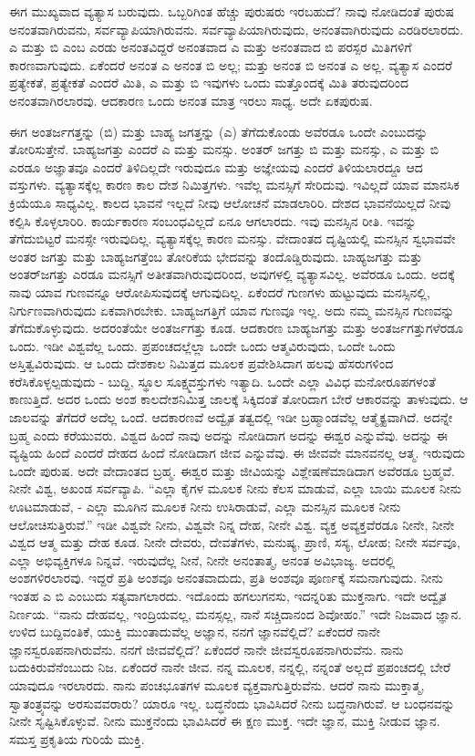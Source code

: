 ಈಗ ಮುಖ್ಯವಾದ ವ್ಯತ್ಯಾಸ ಬರುವುದು. ಒಬ್ಬರಿಗಿಂತ ಹೆಚ್ಚು ಪುರುಷರು ಇರಬಹುದೆ? ನಾವು ನೋಡಿದಂತೆ ಪುರುಷ ಅನಂತವಾಗಿರುವನು, ಸರ್ವವ್ಯಾಪಿಯಾಗಿರುವನು. ಸರ್ವವ್ಯಾಪಿಯಾಗಿರುವುದು, ಅನಂತವಾಗಿರುವುದು ಎರಡಿರಲಾರದು. ಎ ಮತ್ತು ಬಿ ಎಂಬ ಎರಡು ಅನಂತವಿದ್ದರೆ ಅನಂತವಾದ ಎ ಮತ್ತು ಅನಂತವಾದ ಬಿ ಪರಸ್ಪರ ಮಿತಿಗಳಿಗೆ ಕಾರಣವಾಗುವುದು. ಏಕೆಂದರೆ ಅನಂತ ಎ ಅನಂತ ಬಿ ಅಲ್ಲ; ಮತ್ತು ಅನಂತ ಬಿ ಅನಂತ ಎ ಅಲ್ಲ. ವ್ಯತ್ಯಾಸ ಎಂದರೆ ಪ್ರತ್ಯೇಕತೆ, ಪ್ರತ್ಯೇಕತೆ ಎಂದರೆ ಮಿತಿ, ಎ ಮತ್ತು ಬಿ ಇವುಗಳು ಒಂದು ಮತ್ತೊಂದಕ್ಕೆ ಮಿತಿ ತರುವುದರಿಂದ ಅನಂತವಾಗಿರಲಾರವು. ಆದಕಾರಣ ಒಂದು ಅನಂತ ಮಾತ್ರ ಇರಲು ಸಾಧ್ಯ. ಅದೇ ಏಕಪುರುಷ.

ಈಗ ಅಂತರ್ಜಗತ್ತನ್ನು (ಬಿ) ಮತ್ತು ಬಾಹ್ಯ ಜಗತ್ತನ್ನು (ಎ) ತೆಗೆದುಕೊಂಡು ಅವೆರಡೂ ಒಂದೇ ಎಂಬುದನ್ನು ತೋರಿಸುತ್ತೇನೆ. ಬಾಹ್ಯಜಗತ್ತು ಎಂದರೆ ಎ ಮತ್ತು ಮನಸ್ಸು. ಅಂತರ್‌ ಜಗತ್ತು ಬಿ ಮತ್ತು ಮನಸ್ಸು, ಎ ಮತ್ತು ಬಿ ಎರಡೂ ಅಜ್ಞಾತವೂ ಎಂದರೆ ತಿಳಿದಿಲ್ಲದೇ ಇರುವುದೂ ಮತ್ತು ಅಜ್ಞೇಯವು ಎಂದರೆ ತಿಳಿಯಲಾರದ್ದೂ ಆದ ವಸ್ತುಗಳು. ವ್ಯತ್ಯಾಸಕ್ಕೆಲ್ಲ ಕಾರಣ ಕಾಲ ದೇಶ ನಿಮಿತ್ತಗಳು. ಇವೆಲ್ಲ ಮನಸ್ಸಿಗೆ ಸೇರಿದುವು. ಇವಿಲ್ಲದೆ ಯಾವ ಮಾನಸಿಕ ಕ್ರಿಯೆಯೂ ಸಾಧ್ಯವಿಲ್ಲ. ಕಾಲದ ಭಾವನೆ ಇಲ್ಲದೆ ನೀವು ಆಲೋಚನೆ ಮಾಡಲಾರಿರಿ. ದೇಶದ ಭಾವನೆಯಿಲ್ಲದೆ ನೀವು ಕಲ್ಪಿಸಿ ಕೊಳ್ಳಲಾರಿರಿ. ಕಾರ್ಯಕಾರಣ ಸಂಬಂಧವಿಲ್ಲದೆ ಏನೂ ಆಗಲಾರದು. ಇವು ಮನಸ್ಸಿನ ರೀತಿ. ಇವನ್ನು ತೆಗೆದುಬಿಟ್ಟರೆ ಮನಸ್ಸೇ ಇರುವುದಿಲ್ಲ. ವ್ಯತ್ಯಾಸಕ್ಕೆಲ್ಲ ಕಾರಣ ಮನಸ್ಸು. ವೇದಾಂತದ ದೃಷ್ಟಿಯಲ್ಲಿ ಮನಸ್ಸಿನ ಸ್ವಭಾವವೇ ಅಂತರ ಜಗತ್ತು ಮತ್ತು ಬಾಹ್ಯಜಗತ್ತೆಂಬ ತೋರಿಕೆಯ ಭೇದವನ್ನು ತಂದೊಡ್ಡಿರುವುದು. ಬಾಹ್ಯಜಗತ್ತು ಮತ್ತು ಅಂತರ್‌ಜಗತ್ತು ಎರಡೂ ಮನಸ್ಸಿಗೆ ಅತೀತವಾಗಿರುವುದರಿಂದ, ಅವುಗಳಲ್ಲಿ ವ್ಯತ್ಯಾಸವಿಲ್ಲ. ಅವೆರಡೂ ಒಂದು. ಅದಕ್ಕೆ ನಾವು ಯಾವ ಗುಣವನ್ನೂ ಆರೋಪಿಸುವುದಕ್ಕೆ ಆಗುವುದಿಲ್ಲ. ಏಕೆಂದರೆ ಗುಣಗಳು ಹುಟ್ಟುವುದು ಮನಸ್ಸಿನಲ್ಲಿ, ನಿರ್ಗುಣವಾಗಿರುವುದು ಏಕವಾಗಿರಬೇಕು. ಬಾಹ್ಯಜಗತ್ತಿಗೆ ಯಾವ ಗುಣವೂ ಇಲ್ಲ. ಅದು ನಮ್ಮ ಮನಸ್ಸಿನ ಗುಣವನ್ನು ತೆಗೆದುಕೊಳ್ಳುವುದು. ಅದರಂತೆಯೇ ಅಂತರ್ಜಗತ್ತು ಕೂಡ. ಆದಕಾರಣ ಬಾಹ್ಯಜಗತ್ತು ಮತ್ತು ಅಂತರ್ಜಗತ್ತುಗಳೆರಡೂ ಒಂದು. ಇಡೀ ವಿಶ್ವವೆಲ್ಲ ಒಂದು. ಪ್ರಪಂಚದಲ್ಲೆಲ್ಲಾ ಒಂದೇ ಒಂದು ಆತ್ಮವಿರುವುದು, ಒಂದೇ ಒಂದು ಅಸ್ತಿತ್ವವಿರುವುದು. ಆ ಒಂದು ದೇಶಕಾಲ ನಿಮಿತ್ತದ ಮೂಲಕ ಪ್ರವೇಶಿಸಿದಾಗ ಹಲವು ಹೆಸರುಗಳಿಂದ ಕರೆಸಿಕೊಳ್ಳಲ್ಪಡುವುದು - ಬುದ್ದಿ, ಸ್ಥೂಲ ಸೂಕ್ಷ್ಮವಸ್ತುಗಳು ಇತ್ಯಾದಿ. ಒಂದೇ ಎಲ್ಲಾ ವಿವಿಧ ಮನೋರೂಪಗಳಂತೆ ಕಾಣುತ್ತಿದೆ. ಅದರ ಒಂದು ಅಂಶ ಕಾಲದೇಶನಿಮಿತ್ತ ಜಾಲಕ್ಕೆ ಸಿಕ್ಕಿದಂತೆ ತೋರಿದಾಗ ಬೇರೆ ಆಕಾರವನ್ನು ತಾಳುವುದು. ಆ ಜಾಲವನ್ನು ತೆಗೆದರೆ ಅದೆಲ್ಲ ಒಂದೆ. ಆದಕಾರಣವೆ ಅದ್ವೈತ ತತ್ವದಲ್ಲಿ ಇಡೀ ಬ್ರಹ್ಮಾಂಡವೆಲ್ಲ ಆತ್ಮೈಕ್ಯವಾಗಿದೆ. ಅದನ್ನೇ ಬ್ರಹ್ಮ ಎಂದು ಕರೆಯುವರು. ವಿಶ್ವದ ಹಿಂದೆ ನಾವು ಅದನ್ನು ನೋಡಿದಾಗ ಅದನ್ನು ಈಶ್ವರ ಎನ್ನುವೆವು. ಅದನ್ನು ಈ ವ್ಯಷ್ಟಿಯ ಹಿಂದೆ ಎಂದರೆ ದೇಹದ ಹಿಂದೆ ನೋಡಿದಾಗ ಜೀವ ಎನ್ನುವೆವು. ಈ ಜೀವವೇ ಮಾನವನಲ್ಲ ಆತ್ಮ. ಇರುವುದು ಒಂದೇ ಪುರುಷ. ಅದೇ ವೇದಾಂತದ ಬ್ರಹ್ಮ. ಈಶ್ವರ ಮತ್ತು ಜೀವಿಯನ್ನು ವಿಶ್ಲೇಷಣೆಮಾಡಿದಾಗ ಅವೆರಡೂ ಬ್ರಹ್ಮವೆ. ನೀನೇ ವಿಶ್ವ, ಅಖಂಡ ಸರ್ವವ್ಯಾಪಿ. “ಎಲ್ಲಾ ಕೈಗಳ ಮೂಲಕ ನೀನು ಕೆಲಸ ಮಾಡುವೆ, ಎಲ್ಲಾ ಬಾಯಿ ಮೂಲಕ ನೀನು ಊಟಮಾಡುವೆ, - ಎಲ್ಲಾ ಮೂಗಿನ ಮೂಲಕ ನೀನು ಉಸಿರಾಡುವೆ, ಎಲ್ಲಾ ಮನಸ್ಸಿನ ಮೂಲಕ ನೀನು ಆಲೋಚಿಸುತ್ತಿರುವೆ.'' ಇಡೀ ವಿಶ್ವವೇ ನೀನು, ವಿಶ್ವವೇ ನಿನ್ನ ದೇಹ, ನೀನೇ ವಿಶ್ವ. ವ್ಯಕ್ತ ಅವ್ಯಕ್ತವೆರಡೂ ನೀನೇ, ನೀನೇ ವಿಶ್ವದ ಆತ್ಮ ಮತ್ತು ದೇಹ ಕೂಡ. ನೀನೇ ದೇವರು, ದೇವತೆಗಳು, ಮನುಷ್ಯ, ಪ್ರಾಣಿ, ಸಸ್ಯ, ಲೋಹ; ನೀನೇ ಸರ್ವವೂ, ಎಲ್ಲಾ ಅಭಿವ್ಯಕ್ತಿಗಳೂ ನಿನ್ನವೆ. ಇರುವುದೆಲ್ಲ ನೀನೆ, ನೀನೇ ಅನಂತಾತ್ಮ, ಅನಂತ ಅವಿಭಾಜ್ಯ. ಅದರಲ್ಲಿ ಅಂಶಗಳಿರಲಾರವು. ಇದ್ದರೆ ಪ್ರತಿ ಅಂಶವೂ ಅನಂತವಾದುದು, ಪ್ರತಿ ಅಂಶವೂ ಪೂರ್ಣಕ್ಕೆ ಸಮನಾಗುವುದು. ನೀನು ಇಂತಹ ಎ ಬಿ ಎಂಬುದು ಸತ್ಯವಾಗಲಾರದು. ಇದೊಂದು ಹಗಲುಗನಸು, ಇದನ್ನರಿತು ಮುಕ್ತನಾಗು. ಇದೇ ಅದ್ವೈತ ನಿರ್ಣಯ. “ನಾನು ದೇಹವಲ್ಲ, ಇಂದ್ರಿಯವಲ್ಲ, ಮನಸ್ಸಲ್ಲ, ನಾನೆ ಸಚ್ಚಿದಾನಂದ ಶಿವೋಹಂ.'' ಇದೇ ನಿಜವಾದ ಜ್ಞಾನ. ಉಳಿದ ಬುದ್ದಿವಂತಿಕೆ, ಯುಕ್ತಿ ಮುಂತಾದುವೆಲ್ಲ ಅಜ್ಞಾನ, ನನಗೆ ಜ್ಞಾನವೆಲ್ಲಿದೆ? ಏಕೆಂದರೆ ನಾನೇ ಜ್ಞಾನಸ್ವರೂಪನಾಗಿರುವೆನು. ನನಗೆ ಜೀವವೆಲ್ಲಿದೆ? ಏಕೆಂದರೆ ನಾನೇ ಜೀವಸ್ವರೂಪನಾಗಿರುವೆನು. ನಾನು ಬದುಕಿರುವೆನೆಂಬುದು ನಿಜ. ಏಕೆಂದರೆ ನಾನೇ ಜೀವ. ನನ್ನ ಮೂಲಕ, ನನ್ನಲ್ಲಿ, ನನ್ನಂತೆ ಅಲ್ಲದೆ ಪ್ರಪಂಚದಲ್ಲಿ ಬೇರೆ ಯಾವುದೂ ಇರಲಾರದು. ನಾನು ಪಂಚಭೂತಗಳ ಮೂಲಕ ವ್ಯಕ್ತವಾಗುತ್ತಿರುವೆನು. ಆದರೆ ನಾನು ಮುಕ್ತಾತ್ಮ, ಸ್ವಾತಂತ್ರ್ಯವನ್ನು ಅರಸುವವರಾರು? ಯಾರೂ ಇಲ್ಲ. ಬದ್ಧನೆಂದು ಭಾವಿಸಿದರೆ ನೀನು ಬದ್ಧನಾಗಿರುವೆ. ಆ ಬಂಧನವನ್ನು ನೀನೇ ಸೃಷ್ಟಿಸಿಕೊಳ್ಳುವೆ. ನೀನು ಮುಕ್ತನೆಂದು ಭಾವಿಸಿದರೆ ಈ ಕ್ಷಣ ಮುಕ್ತ. ಇದೇ ಜ್ಞಾನ, ಮುಕ್ತಿ ನೀಡುವ ಜ್ಞಾನ. ಸಮಸ್ತ ಪ್ರಕೃತಿಯ ಗುರಿಯೆ ಮುಕ್ತಿ.

